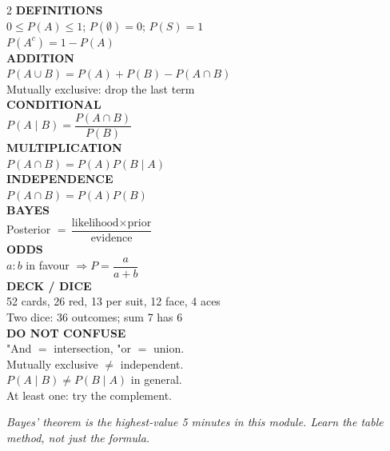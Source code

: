 \documentclass[11pt,a4paper]{article}
\begin{document}
\begin{multicols}{2}
\textbf{DEFINITIONS}\\
$0\le P(A)\le 1$; $P(\emptyset)=0$; $P(S)=1$\\
$P(A^c)=1-P(A)$\\[4pt]
\textbf{ADDITION}\\
$P(A\cup B)=P(A)+P(B)-P(A\cap B)$\\
Mutually exclusive: drop the last term\\[4pt]
\textbf{CONDITIONAL}\\
$P(A\mid B)=\dfrac{P(A\cap B)}{P(B)}$\\[4pt]
\textbf{MULTIPLICATION}\\
$P(A\cap B)=P(A)P(B\mid A)$\\[4pt]
\textbf{INDEPENDENCE}\\
$P(A\cap B)=P(A)P(B)$\\[4pt]
\textbf{BAYES}\\
Posterior $=\dfrac{\text{likelihood}\times\text{prior}}{\text{evidence}}$\\[4pt]
\textbf{ODDS}\\
$a:b$ in favour $\Rightarrow P=\dfrac{a}{a+b}$\\[4pt]
\textbf{DECK / DICE}\\
52 cards, 26 red, 13 per suit, 12 face, 4 aces\\
Two dice: 36 outcomes; sum 7 has 6\\[4pt]
\textbf{DO NOT CONFUSE}\\
"And $=$ intersection, "or $=$ union.\\
Mutually exclusive $\ne$ independent.\\
$P(A\mid B)\ne P(B\mid A)$ in general.\\
At least one: try the complement.
\end{multicols}

\vfill
\begin{center}\textit{Bayes' theorem is the highest-value 5 minutes in this module. Learn the table method, not just the formula.}\end{center}
\end{document}
